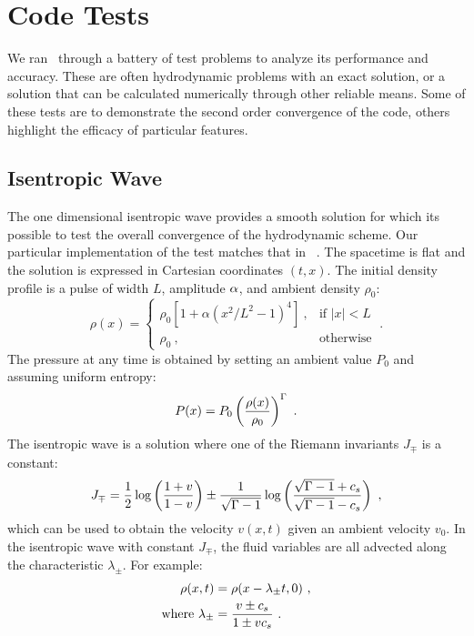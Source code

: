 \section{Code Tests}

We ran \grdisco\ through a battery of test problems to analyze its performance and accuracy.  These are often hydrodynamic problems with an exact solution, or a solution that can be calculated numerically through other reliable means.  Some of these tests are to demonstrate the second order convergence of the code, others highlight the efficacy of particular features.

\subsection{Isentropic Wave}

The one dimensional isentropic wave provides a smooth solution for which its possible to test the overall convergence of the hydrodynamic scheme.  Our particular implementation of the test matches that in \ram\ \citep{Zhang06}.  The spacetime is flat and the solution is expressed in Cartesian coordinates $(t,x)$.  The initial density profile is a pulse of width $L$, amplitude $\alpha$, and ambient density $\rho_0$:
\begin{equation}
	\rho(x) = \left\{\begin{matrix} \rho_0\left[1 + \alpha \left(x^2/L^2-1\right)^4\right]\ , & \text{if } |x| < L \\
							\rho_0\ , & \text{otherwise} \end{matrix} \right . \ .
\end{equation}
The pressure at any time is obtained by setting an ambient value $P_0$ and assuming uniform entropy:
\begin{equation}
	P(x) = P_0 \left(\frac{\rho(x)}{\rho_0}\right)^\Gamma\ .
\end{equation}
The isentropic wave is a solution where one of the Riemann invariants $J_\mp$ is a constant:
\begin{equation}
	J_\mp = \frac{1}{2}\log\left(\frac{1+v}{1-v}\right) \pm \frac{1}{\sqrt{\Gamma-1}}\log \left(\frac{\sqrt{\Gamma-1} + c_s}{\sqrt{\Gamma-1}-c_s}\right)\ ,
\end{equation}
which can be used to obtain the velocity $v(x,t)$ given an ambient velocity $v_0$.  In the isentropic wave with constant $J_\mp$, the fluid variables are all advected along the characteristic $\lambda_\pm$. For example:
\begin{align}
	\rho(x,t) &= \rho(x - \lambda_\pm t, 0) \ , \eqlabel{isenExact} \\
	\text{where } \lambda_\pm &= \frac{v \pm c_s}{1\pm v c_s}\ .
\end{align} 
